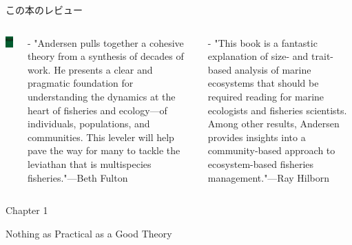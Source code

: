 \documentclass[
  ignorenonframetext,
]{beamer}
\begin{document}
\begin{frame}{この本のレビュー}
\protect\hypertarget{ux3053ux306eux672cux306eux30ecux30d3ux30e5ux30fc}{}

\begin{columns}


\includegraphics[width=100px]{FishEcoEvoBook} 


- "Andersen pulls together a cohesive theory from a synthesis of decades of work. He presents a clear and pragmatic foundation for understanding the dynamics at the heart of fisheries and ecology—of individuals, populations, and communities. This leveler will help pave the way for many to tackle the leviathan that is multispecies fisheries."—Beth Fulton

\vspace{3mm}
- "This book is a fantastic explanation of size- and trait-based analysis of marine ecosystems that should be required reading for marine ecologists and fisheries scientists. Among other results, Andersen provides insights into a community-based approach to ecosystem-based fisheries management."—Ray Hilborn

\end{columns}

\end{frame}

\begin{frame}

\begin{LARGE} 
\begin{center}
\begin{bf}
Chapter 1  
  
Nothing as Practical as a Good Theory
\end{bf}
\end{center}
\end{LARGE}

\end{frame}
\end{document}
